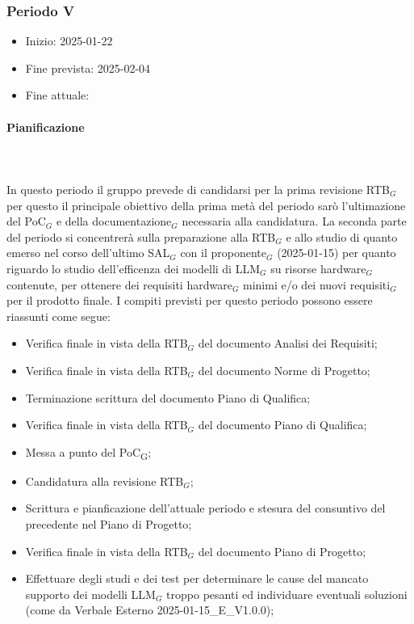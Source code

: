 \subsubsection{Periodo V}

\begin{itemize}
    \item Inizio: 2025-01-22
    \item Fine prevista: 2025-02-04
    \item Fine attuale:
\end{itemize}
\paragraph{Pianificazione} \hspace{1cm}
\\ \hspace{1cm} \\

In questo periodo il gruppo prevede di candidarsi per la prima revisione RTB$_G$ per questo il principale obiettivo della prima metà del periodo sarò l'ultimazione del PoC$_G$ e della documentazione$_G$ necessaria alla candidatura. La seconda parte del periodo si concentrerà sulla preparazione alla RTB$_G$ e allo studio di quanto emerso nel corso dell'ultimo SAL$_G$ con il proponente$_G$ (2025-01-15) per quanto riguardo lo studio dell'efficenza dei modelli di LLM$_G$ su risorse hardware$_G$ contenute, per ottenere dei requisiti hardware$_G$ minimi e/o dei nuovi requisiti$_G$ per il prodotto finale.
I compiti previsti per questo periodo possono essere riassunti come segue:  
\begin{itemize}
    \item Verifica finale in vista della RTB$_G$ del documento Analisi dei Requisiti;
    \item Verifica finale in vista della RTB$_G$ del documento Norme di Progetto;
    \item Terminazione scrittura del documento Piano di Qualifica;
    \item Verifica finale in vista della RTB$_G$ del documento Piano di Qualifica;
    \item Messa a punto del PoC\textsubscript{G};
    \item Candidatura alla revisione RTB$_G$;
    \item Scrittura e pianficazione  dell'attuale periodo e stesura del consuntivo del precedente nel Piano di Progetto;
    \item Verifica finale in vista della RTB$_G$ del documento Piano di Progetto;
    \item Effettuare degli studi e dei test per determinare le cause del mancato supporto dei modelli LLM$_G$ troppo pesanti ed individuare eventuali soluzioni (come da Verbale Esterno 2025-01-15\_E\_V1.0.0);
    
\end{itemize}

